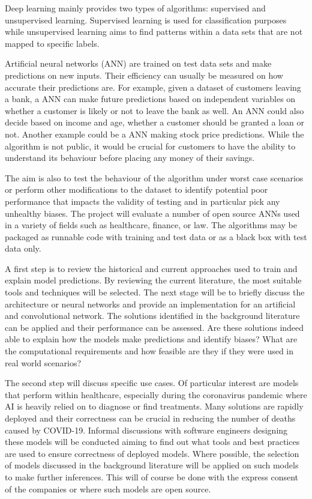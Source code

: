 \documentclass[proposal]{softeng}
\begin{document}
Deep learning mainly provides two types of algorithms: supervised and unsupervised learning. Supervised learning is used for classification purposes while unsupervised learning aims to find patterns within a data sets that are not mapped to specific labels.

Artificial neural networks (ANN) are trained on test data sets and make predictions on new inputs. Their efficiency can usually be measured on how accurate their predictions are. For example, given a dataset of customers leaving a bank, a ANN can make future predictions based on independent variables on whether a customer is likely or not to leave the bank as well. An ANN could also decide based on income and age, whether a customer should be granted a loan or not. Another example could be a ANN making stock price predictions. While the algorithm is not public, it would be crucial for customers to have the ability to understand its behaviour before placing any money of their savings.

The aim is also to test the behaviour of the algorithm under worst case scenarios or perform other modifications to the dataset to identify potential poor performance that impacts the validity of testing and in particular pick any unhealthy biases. The project will evaluate a number of open source ANNs used in a variety of fields such as healthcare, finance, or law. The algorithms may be packaged as runnable code with training and test data or as a black box with test data only. 

A first step is to review the historical and current approaches used to train and explain model predictions. By reviewing the current literature, the most suitable tools and techniques will be selected. The next stage will be to briefly discuss the architecture or neural networks and provide an implementation for an artificial and convolutional network. The solutions identified in the background literature can be applied and their performance can be assessed. Are these solutions indeed able to explain how the models make predictions and identify biases? What are the computational requirements and how feasible are they if they were used in real world scenarios?

The second step will discuss specific use cases. Of particular interest are models that perform within healthcare, especially during the coronavirus pandemic where AI is heavily relied on to diagnose or find treatments. Many solutions are rapidly deployed and their correctness can be crucial in reducing the number of deaths caused by COVID-19. Informal discussions with software engineers designing these models will be conducted aiming to find out what tools and best practices are used to ensure correctness of deployed models. Where possible, the selection of models discussed in the background literature will be applied on such models to make further inferences. This will of course be done with the express consent of the companies or where such models are open source.
\end{document}
